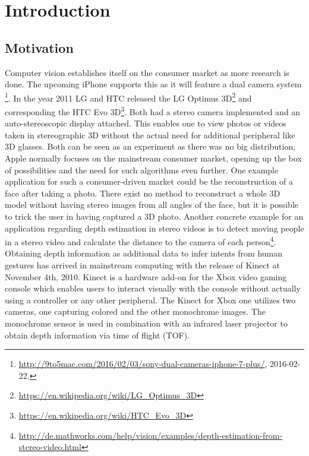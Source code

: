 \chapter{Introduction}
\label{chap:introduction}

\section{Motivation}

Computer vision establishes itself on the consumer market as more research is done.
The upcoming iPhone supports this as it will feature a dual camera system \footnote{\url{http://9to5mac.com/2016/02/03/sony-dual-cameras-iphone-7-plus/}, 2016-02-22.}.
In the year 2011 LG and HTC released the LG Optimus 3D\footnote{\url{https://en.wikipedia.org/wiki/LG_Optimus_3D} } and corresponding the HTC Evo 3D\footnote{\url{https://en.wikipedia.org/wiki/HTC_Evo_3D}}.
Both had a stereo camera implemented and an auto-stereoscopic display attached.
This enables one to view photos or videos taken in stereographic 3D without the actual need for additional peripheral like 3D glasses.
Both can be seen as an experiment as there was no big distribution, Apple normally focuses on the mainstream consumer market, opening up the box of possibilities and the need for such algorithms even further.
One example application for such a consumer-driven market could be the reconstruction of a face after taking a photo.
There exist no method to reconstruct a whole 3D model without having stereo images from all angles of the face, but it is possible to trick the user in having captured a 3D photo.
Another concrete example for an application regarding depth estimation in stereo videos is to detect moving people in a stereo video and calculate the distance to the camera of each person\footnote{\url{http://de.mathworks.com/help/vision/examples/depth-estimation-from-stereo-video.html}}.
\newline\newline\noindent Obtaining depth information as additional data to infer intents from human gestures has arrived in mainstream computing with the release of Kinect at November 4th, 2010.
Kinect is a hardware add-on for the Xbox video gaming console which enables users to interact visually with the console without actually using a controller or any other peripheral.
The Kinect for Xbox one utilizes two cameras, one capturing colored and the other monochrome images.
The monochrome sensor is used in combination with an infrared laser projector to obtain depth information via time of flight (TOF).
